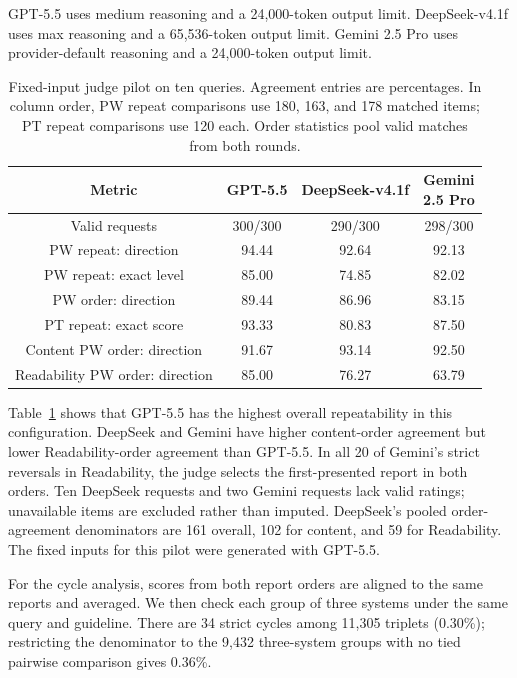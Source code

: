 \documentclass{article}
\begin{document}
GPT-5.5 uses medium reasoning and a 24,000-token output limit. DeepSeek-v4.1f uses max reasoning and a 65,536-token output limit. Gemini 2.5 Pro uses provider-default reasoning and a 24,000-token output limit. 

\begin{table}[t]
\centering
\small
\setlength{\tabcolsep}{4pt}


\begin{tabular}{@{}cccc@{}}
\toprule
Metric & GPT-5.5 & DeepSeek-v4.1f & \shortstack{Gemini\\2.5 Pro} \\
\midrule
Valid requests & 300/300 & 290/300 & 298/300 \\
PW repeat: direction & 94.44 & 92.64 & 92.13 \\
PW repeat: exact level & 85.00 & 74.85 & 82.02 \\
PW order: direction & 89.44 & 86.96 & 83.15 \\
PT repeat: exact score & 93.33 & 80.83 & 87.50 \\
Content PW order: direction & 91.67 & 93.14 & 92.50 \\
Readability PW order: direction & 85.00 & 76.27 & 63.79 \\
\bottomrule
\end{tabular}
\caption{Fixed-input judge pilot on ten queries. Agreement entries are percentages. In column order, PW repeat comparisons use 180, 163, and 178 matched items; PT repeat comparisons use 120 each. Order statistics pool valid matches from both rounds.}
\label{tab:judge_pilot}
\end{table}

Table~\ref{tab:judge_pilot} shows that GPT-5.5 has the highest overall repeatability in this configuration. DeepSeek and Gemini have higher content-order agreement but lower Readability-order agreement than GPT-5.5. In all 20 of Gemini's strict reversals in Readability, the judge selects the first-presented report in both orders. Ten DeepSeek requests and two Gemini requests lack valid ratings; unavailable items are excluded rather than imputed. DeepSeek's pooled order-agreement denominators are 161 overall, 102 for content, and 59 for Readability. The fixed inputs for this pilot were generated with GPT-5.5.

For the cycle analysis, scores from both report orders are aligned to the same reports and averaged. We then check each group of three systems under the same query and guideline. There are 34 strict cycles among 11,305 triplets (0.30\%); restricting the denominator to the 9,432 three-system groups with no tied pairwise comparison gives 0.36\%. 
\end{document}
